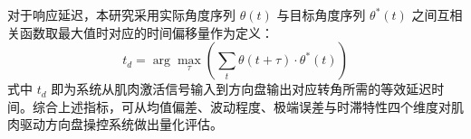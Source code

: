 对于响应延迟，本研究采用实际角度序列 $θ(t)$ 与目标角度序列 $θ^*(t)$ 之间互相关函数取最大值时对应的时间偏移量作为定义：
\begin{equation}
t_d = \arg\max_{\tau} \left( \sum_{t} \theta(t+\tau) \cdot \theta^{*}(t) \right)
\label{eq:delay}
\end{equation}
式中 $t_d$ 即为系统从肌肉激活信号输入到方向盘输出对应转角所需的等效延迟时间。综合上述指标，可从均值偏差、波动程度、极端误差与时滞特性四个维度对肌肉驱动方向盘操控系统做出量化评估。
